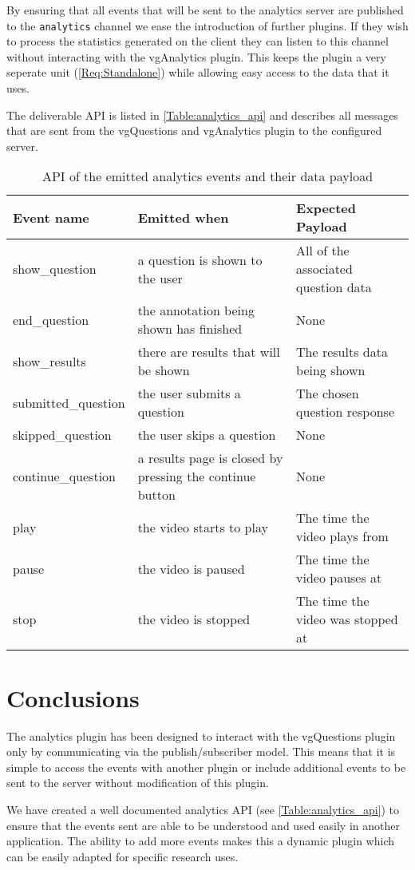 By ensuring that all events that will be sent to the analytics server are published to the \lstinline|analytics| channel we ease the introduction of further plugins. If they wish to process the statistics generated on the client they  can listen to this channel without interacting with the vgAnalytics plugin. This keeps the plugin a very seperate unit (\cref{Req:Standalone}) while allowing easy access to the data that it uses.

The deliverable API is listed in \autoref{Table:analytics_api} and describes all messages that are sent from the vgQuestions and vgAnalytics plugin to the configured server.

\begin{table}[h]
\caption{\label{Table:analytics_api}API of the emitted analytics events and their data payload}
\begin{tabular}{p{3.2cm} p{6cm} p{4cm}}
\textbf{Event name} & \textbf{Emitted when} & \textbf{Expected Payload} \\
\hline
show\_question & a question is shown to the user & All of the associated question data \\
\hline
end\_question & the annotation being shown has finished & None \\
\hline
show\_results & there are results that will be shown & The results data being shown \\
\hline
submitted\_question & the user submits a question & The chosen question response \\
\hline
skipped\_question & the user skips a question & None \\
\hline
continue\_question & a results page is closed by pressing the continue button & None \\
\hline
play & the video starts to play & The time the video plays from \\
\hline
pause & the video is paused & The time the video pauses at \\
\hline
stop & the video is stopped & The time the video was stopped at \\
\end{tabular}
\end{table}

\section{Conclusions}

The analytics plugin has been designed to interact with the \gls{vgQuestions} plugin only by communicating via the publish/subscriber model. This means that it is simple to access the events with another plugin or include additional events to be sent to the server without modification of this plugin.

We have created a well documented analytics \gls{API} (see \autoref{Table:analytics_api}) to ensure that the events sent are able to be understood and used easily in another application. The ability to add more events makes this a dynamic plugin which can be easily adapted for specific research uses.